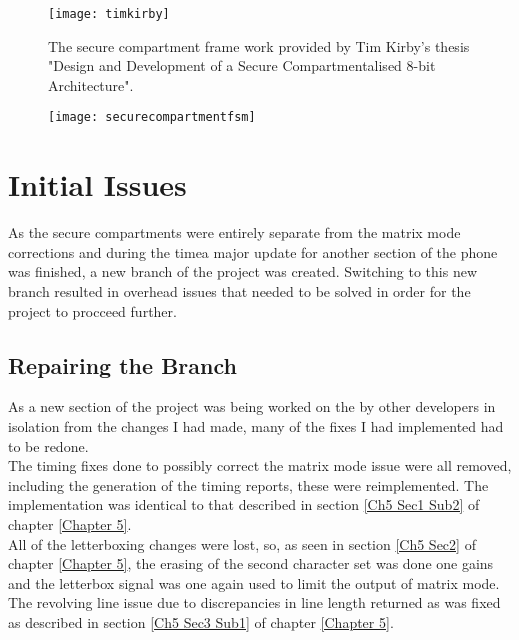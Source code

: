 \begin{figure}
  \centering
  \texttt{[image: timkirby]}
  \caption{The secure compartment frame work provided by Tim Kirby's thesis "Design and Development of a Secure Compartmentalised 8-bit Architecture".}
  \label{fig:timkirby}
\end{figure}

\begin{figure}
  \centering
  \texttt{[image: securecompartmentfsm]}
  \caption{}
  \label{fig:securecompartmentfsm}
\end{figure}


\section{Initial Issues}

\label{Ch6 Sec2}

As the secure compartments were entirely separate from the matrix mode corrections and during the timea major update for another section of the phone was finished, a new branch of the project was created. Switching to this new branch resulted in overhead issues that needed to be solved in order for the project to procceed further.

\subsection{Repairing the Branch}

\label{Ch6 Sec2 Sub1}

As a new section of the project was being worked on the by other developers in isolation from the changes I had made, many of the fixes I had implemented had to be redone.\\
The timing fixes done to possibly correct the matrix mode issue were all removed, including the generation of the timing reports, these were reimplemented. The implementation was identical to that described in section \ref{Ch5 Sec1 Sub2} of chapter \ref{Chapter 5}.\\
All of the letterboxing changes were lost, so, as seen in section \ref{Ch5 Sec2} of chapter \ref{Chapter 5}, the erasing of the second character set was done one gains and the letterbox signal was one again used to limit the output of matrix mode.\\
The revolving line issue due to discrepancies in line length returned as was fixed as described in section \ref{Ch5 Sec3 Sub1} of chapter \ref{Chapter 5}.\\

